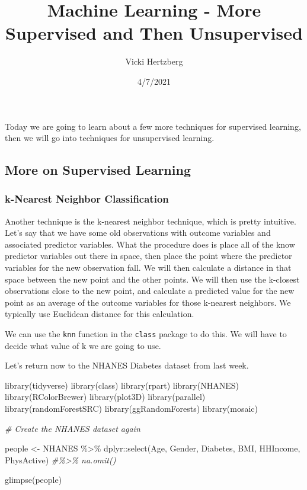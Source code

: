 \documentclass[
]{article}
\title{Machine Learning - More Supervised and Then Unsupervised}
\author{Vicki Hertzberg}
\date{4/7/2021}
\newenvironment{Shaded}{\begin{snugshade}}{\end{snugshade}}
\newcommand{\CommentTok}[1]{\textcolor[rgb]{0.56,0.35,0.01}{\textit{#1}}}
\newcommand{\FunctionTok}[1]{\textcolor[rgb]{0.00,0.00,0.00}{#1}}
\newcommand{\NormalTok}[1]{#1}
\newcommand{\OtherTok}[1]{\textcolor[rgb]{0.56,0.35,0.01}{#1}}
\newcommand{\SpecialCharTok}[1]{\textcolor[rgb]{0.00,0.00,0.00}{#1}}
\begin{document}
\maketitle

Today we are going to learn about a few more techniques for supervised
learning, then we will go into techniques for unsupervised learning.

\hypertarget{more-on-supervised-learning}{%
\subsection{More on Supervised
Learning}\label{more-on-supervised-learning}}

\hypertarget{k-nearest-neighbor-classification}{%
\subsubsection{k-Nearest Neighbor
Classification}\label{k-nearest-neighbor-classification}}

Another technique is the k-nearest neighbor technique, which is pretty
intuitive. Let's say that we have some old observations with outcome
variables and associated predictor variables. What the procedure does is
place all of the know predictor variables out there in space, then place
the point where the predictor variables for the new observation fall. We
will then calculate a distance in that space between the new point and
the other points. We will then use the k-closest observations close to
the new point, and calculate a predicted value for the new point as an
average of the outcome variables for those k-nearest neighbors. We
typically use Euclidean distance for this calculation.

We can use the \texttt{knn} function in the \texttt{class} package to do
this. We will have to decide what value of k we are going to use.

Let's return now to the NHANES Diabetes dataset from last week.

\begin{Shaded}
\begin{Highlighting}[]
\FunctionTok{library}\NormalTok{(tidyverse)}
\FunctionTok{library}\NormalTok{(class)}
\FunctionTok{library}\NormalTok{(rpart)}
\FunctionTok{library}\NormalTok{(NHANES)}
\FunctionTok{library}\NormalTok{(RColorBrewer)}
\FunctionTok{library}\NormalTok{(plot3D)}
\FunctionTok{library}\NormalTok{(parallel)}
\FunctionTok{library}\NormalTok{(randomForestSRC)}
\FunctionTok{library}\NormalTok{(ggRandomForests)}
\FunctionTok{library}\NormalTok{(mosaic)}

\CommentTok{\# Create the NHANES dataset again}

\NormalTok{people }\OtherTok{\textless{}{-}}\NormalTok{ NHANES }\SpecialCharTok{\%\textgreater{}\%} 
\NormalTok{  dplyr}\SpecialCharTok{::}\FunctionTok{select}\NormalTok{(Age, Gender, Diabetes, BMI, HHIncome, PhysActive) }
\CommentTok{\#\%\textgreater{}\% na.omit()}

\FunctionTok{glimpse}\NormalTok{(people)}
\end{Highlighting}
\end{Shaded}
\end{document}

